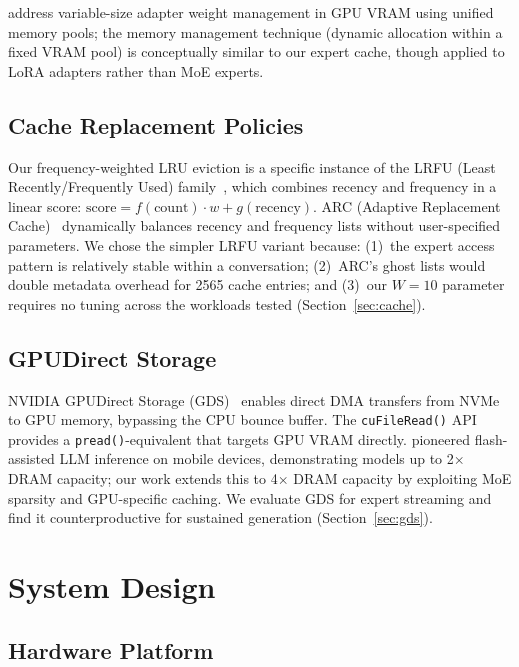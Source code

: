 \documentclass[10pt]{article}
\begin{document}
\citet{slora} address variable-size adapter weight management in GPU VRAM using unified memory pools; the memory management technique (dynamic allocation within a fixed VRAM pool) is conceptually similar to our expert cache, though applied to LoRA adapters rather than MoE experts.

\subsection{Cache Replacement Policies}

Our frequency-weighted LRU eviction is a specific instance of the LRFU (Least Recently/Frequently Used) family~\citep{lrfu}, which combines recency and frequency in a linear score: $\text{score} = f(\text{count}) \cdot w + g(\text{recency})$. ARC (Adaptive Replacement Cache)~\citep{arc} dynamically balances recency and frequency lists without user-specified parameters. We chose the simpler LRFU variant because: (1)~the expert access pattern is relatively stable within a conversation; (2)~ARC's ghost lists would double metadata overhead for 2565 cache entries; and (3)~our $W=10$ parameter requires no tuning across the workloads tested (Section~\ref{sec:cache}).

\subsection{GPUDirect Storage}

NVIDIA GPUDirect Storage (GDS)~\citep{gds} enables direct DMA transfers from NVMe to GPU memory, bypassing the CPU bounce buffer. The \texttt{cuFileRead()} API provides a \texttt{pread()}-equivalent that targets GPU VRAM directly. \citet{llminflash} pioneered flash-assisted LLM inference on mobile devices, demonstrating models up to 2$\times$ DRAM capacity; our work extends this to 4$\times$ DRAM capacity by exploiting MoE sparsity and GPU-specific caching. We evaluate GDS for expert streaming and find it counterproductive for sustained generation (Section~\ref{sec:gds}).

\section{System Design}

\subsection{Hardware Platform}
\end{document}
